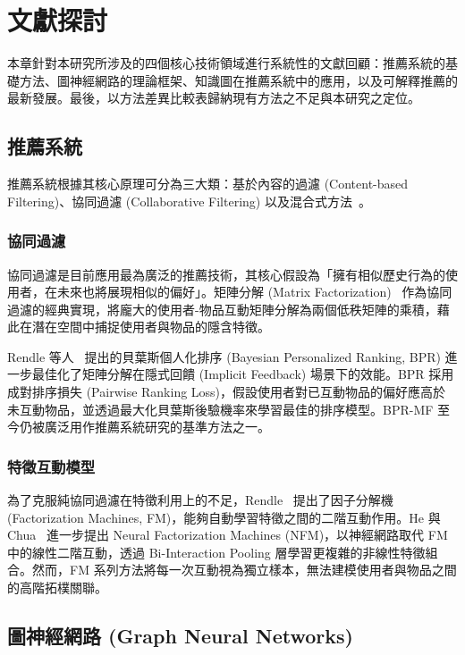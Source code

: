 
\chapter{文獻探討}

本章針對本研究所涉及的四個核心技術領域進行系統性的文獻回顧：推薦系統的基礎方法、圖神經網路的理論框架、知識圖在推薦系統中的應用，以及可解釋推薦的最新發展。最後，以方法差異比較表歸納現有方法之不足與本研究之定位。

\section{推薦系統}

推薦系統根據其核心原理可分為三大類：基於內容的過濾 (Content-based Filtering)、協同過濾 (Collaborative Filtering) 以及混合式方法~\cite{su2009survey}。

\subsection*{協同過濾}

協同過濾是目前應用最為廣泛的推薦技術，其核心假設為「擁有相似歷史行為的使用者，在未來也將展現相似的偏好」。矩陣分解 (Matrix Factorization)~\cite{koren2009matrix} 作為協同過濾的經典實現，將龐大的使用者-物品互動矩陣分解為兩個低秩矩陣的乘積，藉此在潛在空間中捕捉使用者與物品的隱含特徵。

Rendle 等人~\cite{rendle2009bpr} 提出的貝葉斯個人化排序 (Bayesian Personalized Ranking, BPR) 進一步最佳化了矩陣分解在隱式回饋 (Implicit Feedback) 場景下的效能。BPR 採用成對排序損失 (Pairwise Ranking Loss)，假設使用者對已互動物品的偏好應高於未互動物品，並透過最大化貝葉斯後驗機率來學習最佳的排序模型。BPR-MF 至今仍被廣泛用作推薦系統研究的基準方法之一。

\subsection*{特徵互動模型}

為了克服純協同過濾在特徵利用上的不足，Rendle~\cite{rendle2010fm} 提出了因子分解機 (Factorization Machines, FM)，能夠自動學習特徵之間的二階互動作用。He 與 Chua~\cite{he2017nfm} 進一步提出 Neural Factorization Machines (NFM)，以神經網路取代 FM 中的線性二階互動，透過 Bi-Interaction Pooling 層學習更複雜的非線性特徵組合。然而，FM 系列方法將每一次互動視為獨立樣本，無法建模使用者與物品之間的高階拓樸關聯。


\section{圖神經網路 (Graph Neural Networks)}

